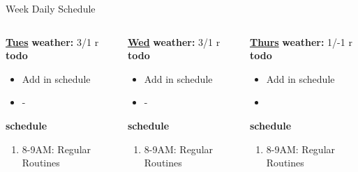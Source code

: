 \begin{columns}
\begin{column}{0.5\linewidth}
{\begin{block}{Week Daily Schedule}
\begin{columns}
\begin{column}{0.14\textwidth}{\small \underline{\bf Tues}}
            {\small \bf weather: } 3/1 r \\ 
            {\small {\bf todo}}\\ 
            \begin{itemize}
              \tiny \item \tiny Add in schedule
            \item \tiny -
            \end{itemize} 
                {\small {\bf schedule}}
                \begin{enumerate} 
                  \tiny \item \tiny 8-9AM: Regular Routines 
                \end{enumerate} 
          \end{column}

          \begin{column}{0.14\textwidth}{\small \underline{\bf Wed}}
            {\small \bf weather: } 3/1 r \\ 
            \small{\bf todo}\\
            \begin{itemize}
              \tiny \item \tiny Add in schedule
            \item \tiny -
            \end{itemize} 
                {\small {\bf schedule}}\\
                \begin{enumerate} 
                  \tiny \item \tiny 8-9AM: Regular Routines 
                \end{enumerate} 
          \end{column}

          \begin{column}{0.14\textwidth}{\small \underline{\bf Thurs}}
            {\small \bf weather: } 1/-1 r \\ 
            {\small {\bf todo}} \\ 
            \begin{itemize}
              \tiny \item \tiny Add in schedule
            \item \tiny 
            \end{itemize} 
                {\small {\bf schedule}} \\
                \begin{enumerate} 
                  \tiny \item \tiny 8-9AM: Regular Routines 
                \end{enumerate}
          \end{column} 
          

\end{columns}
\end{block}}
\end{column}
\end{columns}
